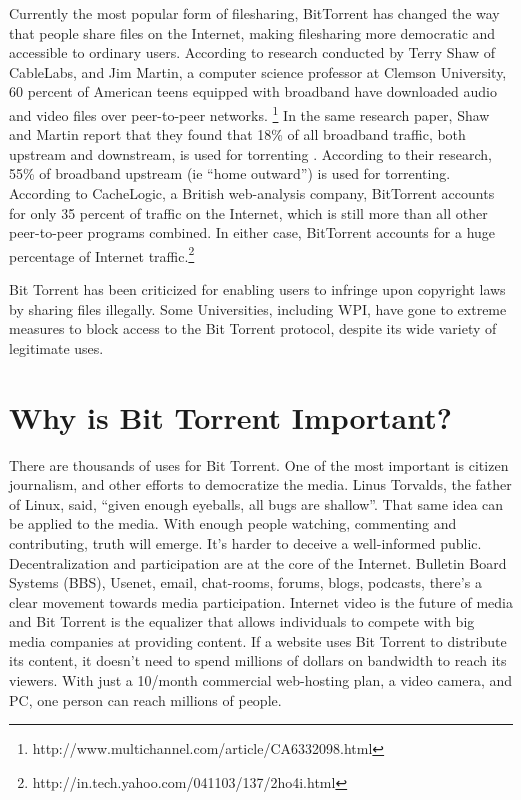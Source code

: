 \documentclass[a4paper,12pt]{report}
\begin{document}
Currently the most popular form of filesharing, BitTorrent has changed the way that people share files on the Internet, making filesharing more democratic and accessible to ordinary users.
According to research conducted by Terry Shaw of CableLabs, and Jim Martin, a computer science professor at Clemson University, 60 percent of American teens equipped with broadband have downloaded audio and video files over peer-to-peer networks. \footnote {http://www.multichannel.com/article/CA6332098.html}
In the same research paper, Shaw and Martin report that they found that 18\% of all broadband traffic, both upstream and downstream, is used for torrenting . 
According to their research, 55\% of broadband upstream (ie “home outward”) is used for torrenting.
According to CacheLogic, a British web-analysis company, BitTorrent accounts for only 35 percent of traffic on the Internet, which is still more than all other peer-to-peer programs combined.  
In either case, BitTorrent accounts for a huge percentage of Internet traffic.\footnote {http://in.tech.yahoo.com/041103/137/2ho4i.html}

Bit Torrent has been criticized for enabling users to infringe upon copyright laws by sharing files illegally. Some Universities, including WPI, have gone to extreme measures to block access to the Bit Torrent protocol, despite its wide variety of legitimate uses. 


\section{Why is Bit Torrent Important?}
There are thousands of uses for Bit Torrent. 
One of the most important is citizen journalism, and other efforts to democratize the media. 
Linus Torvalds, the father of Linux, said, “given enough eyeballs, all bugs are shallow”. 
That same idea can be applied to the media. 
With enough people watching, commenting and contributing, truth will emerge. It’s harder to deceive a well-informed public. 
Decentralization and participation are at the core of the Internet. 
Bulletin Board Systems (BBS), Usenet, email, chat-rooms, forums, blogs, podcasts, there’s a clear movement towards media participation. 
Internet video is the future of media and Bit Torrent is the equalizer that allows individuals to compete with big media companies at providing content. If a website uses Bit Torrent to distribute its content, it doesn’t need to spend millions of dollars on bandwidth to reach its viewers. With just a 10/month commercial web-hosting plan, a video camera, and PC, one person can reach millions of people.
\end{document}
